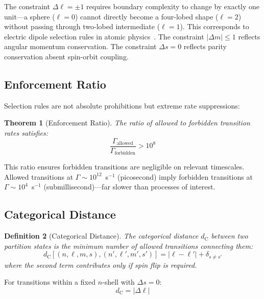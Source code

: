 \documentclass[twocolumn,aps,prb,superscriptaddress,longbibliography,floatfix]{revtex4-2}
\newtheorem{theorem}{Theorem}[section]
\newtheorem{definition}[theorem]{Definition}
\theoremstyle{remark}
\newcommand{\dC}{d_\text{C}}
\begin{document}
The constraint $\Delta \ell = \pm 1$ requires boundary complexity to
change by exactly one unit---a sphere ($\ell=0$) cannot directly become a
four-lobed shape ($\ell=2$) without passing through two-lobed intermediate
($\ell=1$). This corresponds to electric dipole selection rules in atomic
physics~\cite{Sakurai2017}. The constraint $|\Delta m| \leq 1$ reflects
angular momentum conservation. The constraint $\Delta s = 0$ reflects
parity conservation absent spin-orbit coupling.

\subsection{Enforcement Ratio}

Selection rules are not absolute prohibitions but extreme rate
suppressions:

\begin{theorem}[Enforcement Ratio]
\label{thm:enforcement}
The ratio of allowed to forbidden transition rates satisfies:
\begin{equation}
\frac{\Gamma_\text{allowed}}{\Gamma_\text{forbidden}} > 10^8
\label{eq:enforcement}
\end{equation}
\end{theorem}

This ratio ensures forbidden transitions are negligible on relevant
timescales. Allowed transitions at $\Gamma \sim 10^{12}$~s$^{-1}$
(picosecond) imply forbidden transitions at $\Gamma \sim 10^{4}$~s$^{-1}$
(submillisecond)---far slower than processes of interest.

\subsection{Categorical Distance}

\begin{definition}[Categorical Distance]
\label{def:categorical_distance}
The categorical distance $\dC$ between two partition states is the minimum
number of allowed transitions connecting them:
\begin{equation}
\dC[(n,\ell,m,s), (n',\ell',m',s')] = |\ell - \ell'| + \delta_{s \neq s'}
\end{equation}
where the second term contributes only if spin flip is required.
\end{definition}

For transitions within a fixed $n$-shell with $\Delta s = 0$:
\begin{equation}
\dC = |\Delta \ell|
\end{equation}
\end{document}
